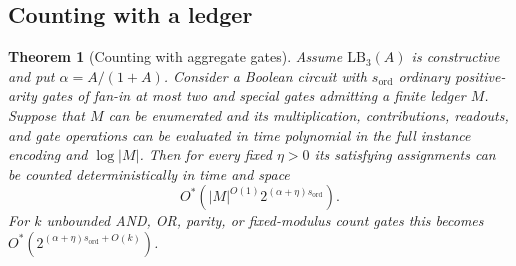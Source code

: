 \documentclass[11pt]{article}
\theoremstyle{plain}
\newtheorem{theorem}{Theorem}[section]
\theoremstyle{definition}
\theoremstyle{remark}
\newcommand{\LB}{\mathrm{LB}}
\newcommand{\card}[1]{\lvert #1\rvert}
\begin{document}
\subsection{Counting with a ledger}

\begin{theorem}[Counting with aggregate gates]
\label{thm:ledger-counting}
Assume $\LB_3(A)$ is constructive and put $\alpha=A/(1+A)$. Consider a Boolean circuit with
$s_{\mathrm{ord}}$ ordinary positive-arity gates of fan-in at most two and special gates
admitting a finite ledger $M$. Suppose that $M$ can be enumerated and its multiplication,
contributions, readouts, and gate operations can be evaluated in time polynomial in the full
instance encoding and $\log\card M$. Then for every fixed $\eta>0$ its satisfying assignments
can be counted deterministically in time and space
\[
  O^*\!\left(\card M^{O(1)}2^{(\alpha+\eta)s_{\mathrm{ord}}}\right).
\]
For $k$ unbounded AND, OR, parity, or fixed-modulus count gates this becomes
$O^*(2^{(\alpha+\eta)s_{\mathrm{ord}}+O(k)})$.
\end{theorem}
\end{document}

